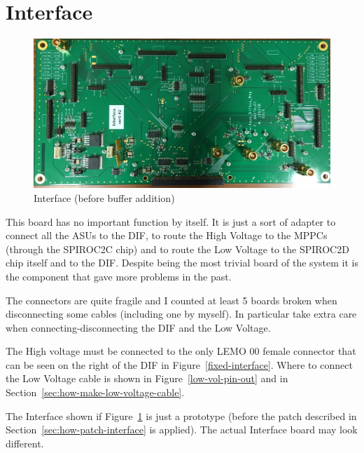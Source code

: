 \section{Interface}
\begin{figure}[H]
  \centering \includegraphics[width=0.8\linewidth, frame]{Interface}
  \caption{Interface (before buffer addition)}\label{fig:Interface}
\end{figure}
This board has no important function by itself. It is just a sort of adapter to
connect all the ASUs to the DIF, to route the High Voltage to the MPPCs (through
the SPIROC2C chip) and to route the Low Voltage to the SPIROC2D chip itself and
to the DIF. Despite being the most trivial board of the system it is the
component that gave more problems in the past.

The connectors are quite fragile and I counted at least 5 boards broken when
disconnecting some cables (including one by myself). In particular take extra
care when connecting-disconnecting the DIF and the Low Voltage.

The High voltage must be connected to the only LEMO 00 female connector that can
be seen on the right of the DIF in Figure~\ref{fixed-interface}. Where to
connect the Low Voltage cable is shown in Figure~\ref{low-vol-pin-out} and in
Section~\ref{sec:how-make-low-voltage-cable}.

The Interface shown if Figure~\ref{fig:Interface} is just a prototype (before
the patch described in Section~\ref{sec:how-patch-interface} is applied). The
actual Interface board may look different.

